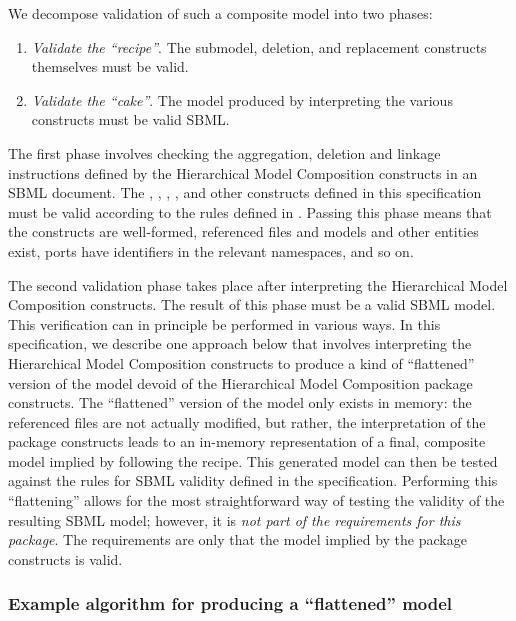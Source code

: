 We decompose validation of such a composite model into two phases:

\begin{enumerate}\setlength{\parskip}{0ex}

\item \emph{Validate the ``recipe''}. The submodel, deletion, and replacement constructs themselves must be valid.

\item \emph{Validate the ``cake''}. The model produced by interpreting the various constructs must be valid SBML.

\end{enumerate}

The first phase involves checking the aggregation, deletion and linkage instructions defined by the Hierarchical Model Composition constructs in an SBML document. The \Submodel, \Port, \Deletion, \ReplacedElement, \ReplacedBy and other constructs defined in this specification must be valid according to the rules defined in . Passing this phase means that the constructs are well-formed, referenced files and models and other entities exist, ports have identifiers in the relevant namespaces, and so on.

The second validation phase takes place after interpreting the Hierarchical Model Composition constructs. The result of this phase must be a valid SBML model. This verification can in principle be performed in various ways. In this specification, we describe one approach below that involves interpreting the Hierarchical Model Composition constructs to produce a kind of ``flattened'' version of the model devoid of the Hierarchical Model Composition package constructs. The ``flattened'' version of the model only exists in memory: the referenced files are not actually modified, but rather, the interpretation of the package constructs leads to an in-memory representation of a final, composite model implied by following the recipe. This generated model can then be tested against the rules for SBML validity defined in the \sbmlthreecore specification. Performing this ``flattening'' allows for the most straightforward way of testing the validity of the resulting SBML model; however, it is \emph{not part of the requirements for this package}. The requirements are only that the model implied by the package constructs is valid.


\subsubsection{Example algorithm for producing a ``flattened'' model}

